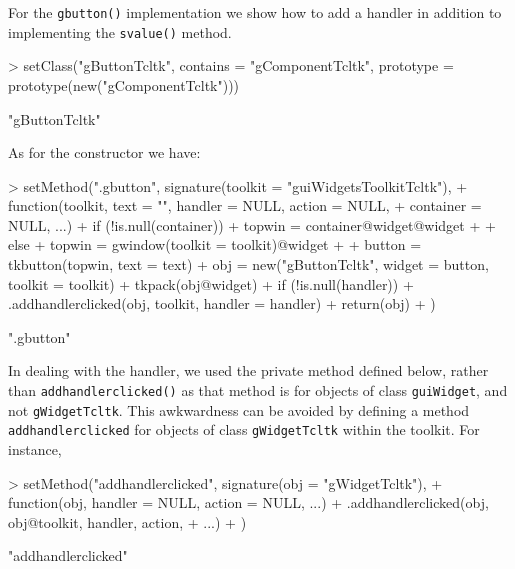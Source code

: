 \documentclass[12pt]{article}
\newcommand{\RCode}[1]{\texttt{#1}}
\newcommand{\RFunc}[1]{\texttt{#1()}}
\begin{document}
For the \RFunc{gbutton} implementation we show how to add a handler in
addition to implementing the \RFunc{svalue} method.

\begin{Schunk}
\begin{Sinput}
> setClass("gButtonTcltk", contains = "gComponentTcltk", prototype = prototype(new("gComponentTcltk")))
\end{Sinput}
\begin{Soutput}
[1] "gButtonTcltk"
\end{Soutput}
\end{Schunk}

As for the constructor we have:
\begin{Schunk}
\begin{Sinput}
> setMethod(".gbutton", signature(toolkit = "guiWidgetsToolkitTcltk"), 
+     function(toolkit, text = "", handler = NULL, action = NULL, 
+         container = NULL, ...) {
+         if (!is.null(container)) {
+             topwin = container@widget@widget
+         }
+         else {
+             topwin = gwindow(toolkit = toolkit)@widget
+         }
+         button = tkbutton(topwin, text = text)
+         obj = new("gButtonTcltk", widget = button, toolkit = toolkit)
+         tkpack(obj@widget)
+         if (!is.null(handler)) 
+             .addhandlerclicked(obj, toolkit, handler = handler)
+         return(obj)
+     })
\end{Sinput}
\begin{Soutput}
[1] ".gbutton"
\end{Soutput}
\end{Schunk}
In dealing with the handler, we used the private method defined below,
rather than \RFunc{addhandlerclicked} as that method is for objects of
class \RCode{guiWidget}, and not \RCode{gWidgetTcltk}. This awkwardness
can be avoided by defining a method \RCode{addhandlerclicked} for
objects of class \RCode{gWidgetTcltk} within the toolkit. For instance,

\begin{Schunk}
\begin{Sinput}
> setMethod("addhandlerclicked", signature(obj = "gWidgetTcltk"), 
+     function(obj, handler = NULL, action = NULL, ...) {
+         .addhandlerclicked(obj, obj@toolkit, handler, action, 
+             ...)
+     })
\end{Sinput}
\begin{Soutput}
[1] "addhandlerclicked"
\end{Soutput}
\end{Schunk}
\end{document}
